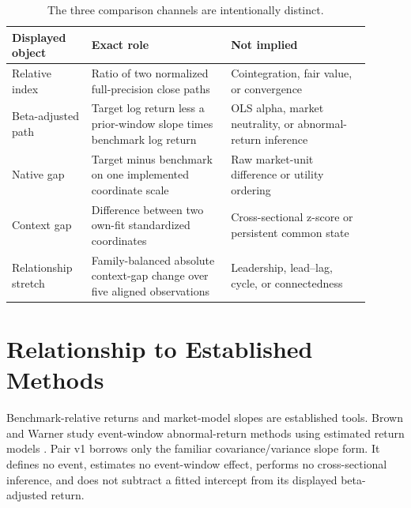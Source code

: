 \documentclass{article}
\begin{document}
\begin{center}
\end{center}

\begin{table}[h]
\centering
\small
\setlength{\tabcolsep}{4pt}
\begin{tabular}{p{0.20\linewidth}p{0.35\linewidth}p{0.35\linewidth}}
\toprule
Displayed object & Exact role & Not implied \\
\midrule
Relative index & Ratio of two normalized full-precision close paths & Cointegration, fair value, or convergence \\
Beta-adjusted path & Target log return less a prior-window slope times benchmark log return & OLS alpha, market neutrality, or abnormal-return inference \\
Native gap & Target minus benchmark on one implemented coordinate scale & Raw market-unit difference or utility ordering \\
Context gap & Difference between two own-fit standardized coordinates & Cross-sectional z-score or persistent common state \\
Relationship stretch & Family-balanced absolute context-gap change over five aligned observations & Leadership, lead--lag, cycle, or connectedness \\
\bottomrule
\end{tabular}
\caption{The three comparison channels are intentionally distinct.}
\label{tab:channels}
\end{table}

\section{Relationship to Established Methods}

Benchmark-relative returns and market-model slopes are established tools. Brown and Warner study event-window abnormal-return methods using estimated return models \citep{brownwarner1985daily}. Pair v1 borrows only the familiar covariance/variance slope form. It defines no event, estimates no event-window effect, performs no cross-sectional inference, and does not subtract a fitted intercept from its displayed beta-adjusted return.
\end{document}
